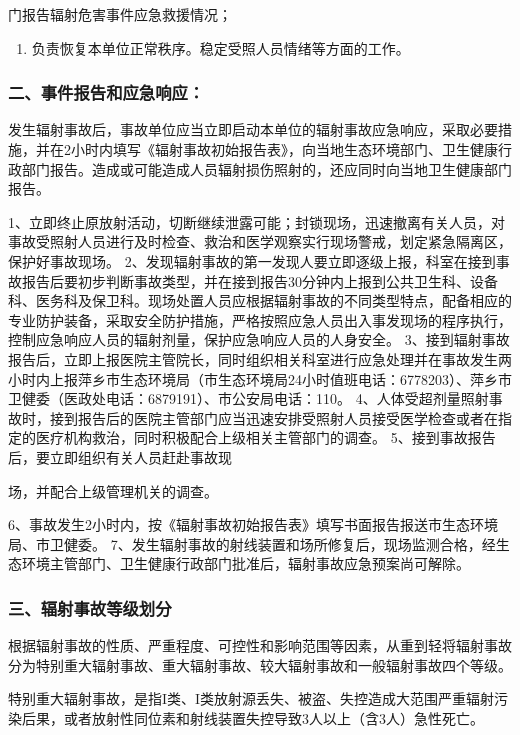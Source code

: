 门报告辐射危害事件应急救援情况；

\begin{enumerate}
\item 负责恢复本单位正常秩序。稳定受照人员情绪等方面的工作。
\end{enumerate}

\subsubsection{二、事件报告和应急响应：}

发生辐射事故后，事故单位应当立即启动本单位的辐射事故应急响应，采取必要措施，并在2小时内填写《辐射事故初始报告表》，向当地生态环境部门、卫生健康行政部门报告。造成或可能造成人员辐射损伤照射的，还应同时向当地卫生健康部门报告。

1、立即终止原放射活动，切断继续泄露可能；封锁现场，迅速撤离有关人员，对事故受照射人员进行及时检查、救治和医学观察实行现场警戒，划定紧急隔离区，保护好事故现场。
2、发现辐射事故的第一发现人要立即逐级上报，科室在接到事故报告后要初步判断事故类型，并在接到报告30分钟内上报到公共卫生科、设备科、医务科及保卫科。现场处置人员应根据辐射事故的不同类型特点，配备相应的专业防护装备，采取安全防护措施，严格按照应急人员出入事发现场的程序执行，控制应急响应人员的辐射剂量，保护应急响应人员的人身安全。
3、接到辐射事故报告后，立即上报医院主管院长，同时组织相关科室进行应急处理并在事故发生两小时内上报萍乡市生态环境局（市生态环境局24小时值班电话：6778203）、萍乡市卫健委（医政处电话：6879191）、市公安局电话：110。
4、人体受超剂量照射事故时，接到报告后的医院主管部门应当迅速安排受照射人员接受医学检查或者在指定的医疗机构救治，同时积极配合上级相关主管部门的调查。
5、接到事故报告后，要立即组织有关人员赶赴事故现

场，并配合上级管理机关的调查。

6、事故发生2小时内，按《辐射事故初始报告表》填写书面报告报送市生态环境局、市卫健委。
7、发生辐射事故的射线装置和场所修复后，现场监测合格，经生态环境主管部门、卫生健康行政部门批准后，辐射事故应急预案尚可解除。

\subsubsection{三、辐射事故等级划分}

根据辐射事故的性质、严重程度、可控性和影响范围等因素，从重到轻将辐射事故分为特别重大辐射事故、重大辐射事故、较大辐射事故和一般辐射事故四个等级。

特别重大辐射事故，是指I类、I类放射源丢失、被盗、失控造成大范围严重辐射污染后果，或者放射性同位素和射线装置失控导致3人以上（含3人）急性死亡。

